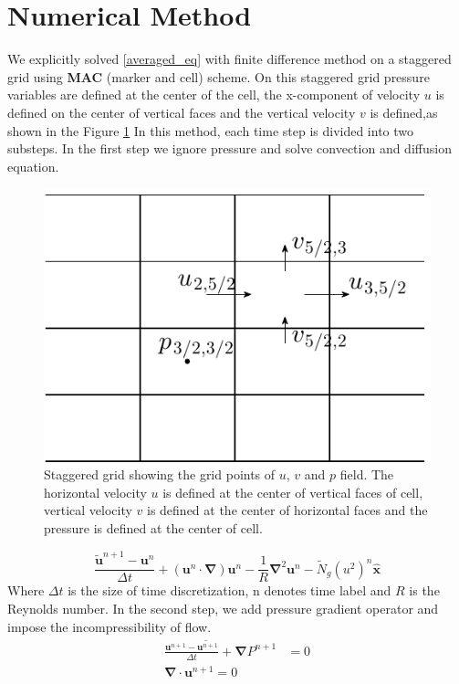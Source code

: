 \documentclass[12pt]{report}   %
\newcommand{\bx}{{\boldsymbol{\hat{x}}}}
\newcommand{\bu}{\mathbf{u}}
\newcommand{\grad}{\mathbf{\nabla}}
\newcommand{\Ndg}{\tilde{N}_g}
\begin{document}
\section{Numerical Method}
We explicitly solved  
\eqref{averaged_eq} with finite difference method on a staggered grid using {\bf{MAC}} (marker and cell) scheme. On this staggered grid pressure variables are defined at the center of the cell, the x-component of velocity $u$ is defined on the center of vertical faces and the vertical velocity $v$ is defined,as shown in the Figure \ref{staggered}
In this method, each time step is divided into two substeps. In the first step we ignore pressure and solve convection and diffusion equation.
\begin{figure}
\centerline{\includegraphics{StaggardGrid}}
\caption{Staggered grid showing the grid points of $u$, $v$ and $p$ field. The horizontal velocity $u$ is defined at the center of vertical faces of cell, vertical velocity $v$ is defined at the center of horizontal faces and the pressure is defined at the center of cell.   }
\label{staggered}
\end{figure}
\begin{equation}
\frac{\tilde{\bu}^{n+1}-\bu^{n}}{\Delta t}+(\bu^n \cdot \grad )\bu^n - \frac{1}{R} \grad^2 \bu^n -\Ndg (u^2)^n\bx
\label{TransportEq}
\end{equation}
Where $\Delta t$ is the size of time discretization, n denotes time label and $R$ is the Reynolds number. In the second step, we add pressure gradient operator and impose the incompressibility of flow.
\begin{equation}
\begin{split}
 \frac{\bu^{n+1}-\tilde{\bu^{n+1}}}{\Delta t} +\grad P^{n+1} &= 0\\
 \grad \cdot \bu^{n+1} = 0
 \label{IncompressibleCondEq}
 \end{split}
\end{equation}
\end{document}
